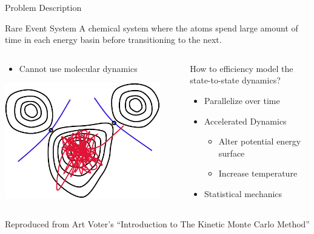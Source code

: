 \documentclass[onlymath]{beamer}
\begin{document}
\begin{frame}{Problem Description}

  \begin{block}{Rare Event System}
    A chemical system where the atoms spend large amount of time in each energy basin
    before transitioning to the next.
  \end{block}

  \begin{columns}[T]

    \begin{column}[l]{0.5\textwidth}
      \begin{itemize}

        \item Cannot use molecular dynamics

      \end{itemize}

      \includegraphics[width=0.9\textwidth]{images/rare-event}

    \end{column}

    \begin{column}[r]{0.5\textwidth}

      How to efficiency model the state-to-state dynamics? 

      \begin{itemize}
        \item Parallelize over time
        \item Accelerated Dynamics
          \begin{itemize}
            \item Alter potential energy surface
            \item Increase temperature
          \end{itemize}
        \item \alert<2>{Statistical mechanics}
      \end{itemize}
    \end{column}
  \end{columns}
  \vspace{2mm}
  \tiny
  Reproduced from Art Voter's ``Introduction to The Kinetic Monte Carlo Method''

\end{frame}
\end{document}
